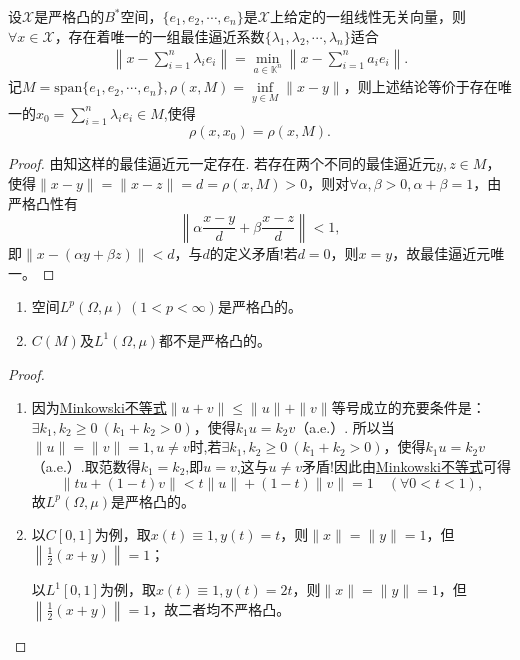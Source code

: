\documentclass[../../main.tex]{subfiles}%
\begin{document}
\begin{theorem}
设$\mathscr{X}$是严格凸的$B^*$空间，$\{e_1,e_2,\cdots,e_n\}$是$\mathscr{X}$上给定的一组线性无关向量，则$\forall x \in \mathscr{X}$，存在着唯一的一组最佳逼近系数$\{\lambda_1,\lambda_2,\cdots,\lambda_n\}$适合
\begin{align*}
\left\| x - \sum\limits_{i=1}^n \lambda_i e_i \right\| = \min\limits_{a \in \mathbb{K}^n} \left\| x - \sum\limits_{i=1}^n a_i e_i \right\|.
\end{align*}
记$M = \text{span}\{e_1,e_2,\cdots,e_n\}, \rho(x,M) = \inf\limits_{y \in M} \|x-y\|$，则上述结论等价于存在唯一的$x_0 = \sum\limits_{i=1}^n \lambda_i e_i\in M$,使得
$$\rho(x,x_0) = \rho(x,M).$$
\end{theorem}
\begin{proof}

由知这样的最佳逼近元一定存在.
若存在两个不同的最佳逼近元$y,z \in M$，使得$\|x-y\| = \|x-z\| = d = \rho(x,M)>0$，则对$\forall \alpha,\beta>0, \alpha+\beta=1$，由严格凸性有
$$\left\| \alpha \frac{x-y}{d} + \beta \frac{x-z}{d} \right\| < 1,$$
即$\|x - (\alpha y + \beta z)\| < d$，与$d$的定义矛盾!若$d=0$，则$x=y$，故最佳逼近元唯一。

\end{proof}

\begin{proposition}
\begin{enumerate}[(1)]
\item 空间$L^p(\Omega,\mu) \ (1 < p < \infty)$是严格凸的。

\item $C(M)$及$L^1(\Omega,\mu)$都不是严格凸的。
\end{enumerate}
\end{proposition}
\begin{proof}
\begin{enumerate}[(1)]
\item 因为\hyperref[Real-Analysis-theorem:实变函数--Minkowski不等式]{Minkowski不等式}$\|u+v\| \leqslant \|u\| + \|v\|$等号成立的充要条件是：$\exists k_1,k_2 \geqslant 0 \ (k_1+k_2>0)$，使得$k_1 u = k_2 v$（a.e.）.
所以当$\|u\|=\|v\|=1, u \neq v$时,若$\exists k_1,k_2 \geqslant 0 \ (k_1+k_2>0)$，使得$k_1 u = k_2 v$（a.e.）.取范数得$k_1=k_2$,即$u=v$,这与$u\neq v$矛盾!因此由\hyperref[Real-Analysis-theorem:实变函数--Minkowski不等式]{Minkowski不等式}可得
$$\|tu + (1-t)v\| < t\|u\| + (1-t)\|v\| = 1 \quad (\forall 0 < t < 1),$$
故$L^p(\Omega,\mu)$是严格凸的。

\item 以$C[0,1]$为例，取$x(t) \equiv 1, y(t)=t$，则$\|x\|=\|y\|=1$，但$\left\| \frac{1}{2}(x+y) \right\| = 1$；

以$L^1[0,1]$为例，取$x(t) \equiv 1, y(t)=2t$，则$\|x\|=\|y\|=1$，但$\left\| \frac{1}{2}(x+y) \right\| = 1$，故二者均不严格凸。
\end{enumerate}
\end{proof}
\end{document}
